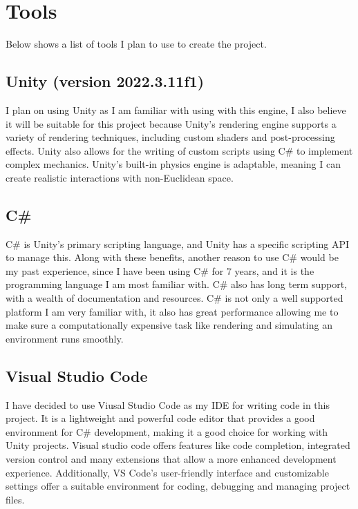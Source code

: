\documentclass[]{article}
\begin{document}
    \newpage
    \section{Tools}
        Below shows a list of tools I plan to use to create the project. 
            \subsection{Unity (version 2022.3.11f1)} 
                I plan on using Unity as I am familiar with using with this engine, I also believe it will 
                be suitable for this project because Unity's rendering engine supports a variety of rendering techniques, 
                including custom shaders and post-processing effects. Unity also allows for the writing of custom scripts 
                using C\# to implement complex mechanics. Unity's built-in physics engine is adaptable, meaning I can create 
                realistic interactions with non-Euclidean space.
            \subsection{C\#}
                C\# is Unity's primary scripting language, and Unity has a specific scripting API to manage this. Along with these benefits,
                another reason to use C\# would be my past experience, since I have been using C\#
                for 7 years, and it is the programming language I am most familiar with. C\# also has long term support, with a wealth of 
                documentation and resources. C\# is not only a well supported platform I am very familiar with, it also has great performance 
                allowing me to make sure a computationally expensive task like rendering and simulating an environment runs smoothly.
            \subsection{Visual Studio Code}
                I have decided to use Viusal Studio Code as my IDE for writing code in this project. It is a lightweight and powerful code 
                editor that provides a good environment for C\# development, making it a good choice for working with Unity projects. Visual 
                studio code offers features like code completion, integrated version control and many extensions that allow a more enhanced 
                development experience. Additionally, VS Code's user-friendly interface and customizable settings offer a suitable environment 
                for coding, debugging and managing project files.
\end{document}
